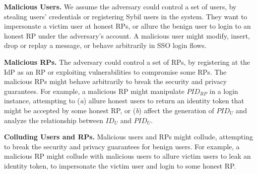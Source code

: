 
\noindent \textbf{Malicious Users.}
We assume the adversary could control a set of users,
 by stealing users' credentials or registering Sybil users in the system.
They want to impersonate a victim user at honest RPs, or allure the benign user to login to an honest RP under the adversary's account.
A malicious user might
    modify, insert, drop or replay a message, or behave arbitrarily in SSO login flows.



\noindent \textbf{Malicious RPs.}
The adversary could control a set of RPs, by registering at the IdP as an RP
     or exploiting vulnerabilities to compromise some RPs.
The malicious RPs might behave arbitrarily to break the security and privacy guarantees.
For example,
a malicious RP might manipulate $PID_{RP}$ in a login instance,
    attempting to (\emph{a}) allure honest users to return an identity token that might be accepted by some honest RP,
or (\emph{b}) affect the generation of $PID_U$ and
    analyze the relationship between $ID_U$ and $PID_U$.


\noindent \textbf{Colluding Users and RPs.}
Malicious users and RPs might collude,
 attempting to break the security and privacy guarantees for benign users.
For example, a malicious RP might collude with malicious users to allure victim users to leak an identity token,
    to impersonate the victim user and login to some honest RP.

